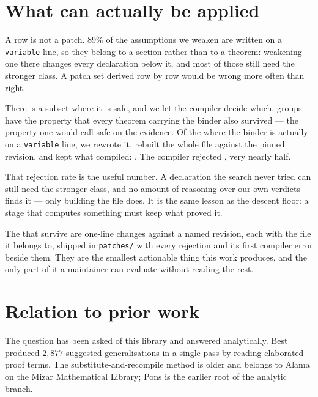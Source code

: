 \documentclass[11pt]{article}
\begin{document}
\section{What can actually be applied}\label{sec:patches}

A row is not a patch. \(89\%\) of the assumptions we weaken are written on a
\texttt{variable} line, so they belong to a section rather than to a theorem:
weakening one there changes every declaration below it, and most of those still
need the stronger class. A patch set derived row by row would be wrong more
often than right.

There is a subset where it is safe, and we let the compiler decide which.
\patchGroups{} groups have the property that every theorem carrying the binder
also survived --- the property one would call safe on the evidence. Of the
\patchTested{} where the binder is actually on a \texttt{variable} line, we
rewrote it, rebuilt the whole file against the pinned revision, and kept what
compiled: \textbf{\patchKept{}}. The compiler rejected \patchRejected{}, very nearly
half.

That rejection rate is the useful number. A declaration the search never tried
can still need the stronger class, and no amount of reasoning over our own
verdicts finds it --- only building the file does. It is the same lesson as the
descent floor: a stage that computes something must keep what proved it.

The \patchKept{} that survive are one-line changes against a named revision,
each with the file it belongs to, shipped in \texttt{patches/} with every
rejection and its first compiler error beside them. They are the smallest
actionable thing this work produces, and the only part of it a maintainer can
evaluate without reading the rest.

\section{Relation to prior work}\label{sec:prior}

The question has been asked of this library and answered analytically. Best
\cite{best2021} produced $2{,}877$ suggested generalisations in a single pass by
reading elaborated proof terms. The substitute-and-recompile method is older and
belongs to Alama \cite{alama2013} on the Mizar Mathematical Library; Pons
\cite{pons2002} is the earlier root of the analytic branch.
\end{document}
